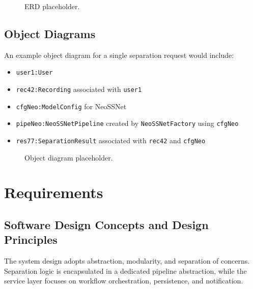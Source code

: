 \documentclass[12pt,a4paper]{report}
\begin{document}
\begin{figure}[h]
  \centering
  \caption{ERD placeholder.}
\end{figure}

\subsection{Object Diagrams}
An example object diagram for a single separation request would include:
\begin{itemize}[nosep]
  \item \texttt{user1:User}
  \item \texttt{rec42:Recording} associated with \texttt{user1}
  \item \texttt{cfgNeo:ModelConfig} for NeoSSNet
  \item \texttt{pipeNeo:NeoSSNetPipeline} created by \texttt{NeoSSNetFactory} using \texttt{cfgNeo}
  \item \texttt{res77:SeparationResult} associated with \texttt{rec42} and \texttt{cfgNeo}
\end{itemize}

\begin{figure}[h]
  \centering
  \caption{Object diagram placeholder.}
\end{figure}

\section{Requirements}

\subsection{Software Design Concepts and Design Principles}
The system design adopts abstraction, modularity, and separation of concerns. Separation logic is encapsulated in a dedicated pipeline abstraction, while the service layer focuses on workflow orchestration, persistence, and notification.
\end{document}
